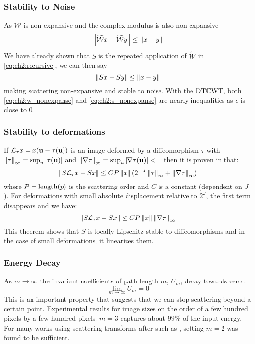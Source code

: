 \subsubsection{Stability to Noise}
As $\mathcal{W}$ is non-expansive and the complex modulus is also non-expansive
\begin{equation}
  \left\lVert \widetilde{\mathcal{W}}x - \widetilde{\mathcal{W}}y \right\rVert \leq \left\lVert x-y \right\rVert \label{eq:ch2:w_nonexpanse}
\end{equation}
We have already shown that $S$ is the repeated application of $\widetilde{\mathcal{W}}$ in
\eqref{eq:ch2:recursive}, we can then say
\begin{equation}
  \left\lVert Sx - Sy \right\rVert \leq \left\lVert x-y \right\rVert\label{eq:ch2:s_nonexpanse}
\end{equation}
making scattering non-expansive and stable to noise. With the $\mathrm{DT}\mathbb{C}\mathrm{WT}$, both
\eqref{eq:ch2:w_nonexpanse} and \eqref{eq:ch2:s_nonexpanse} are nearly
inequalities as $\epsilon$ is close to 0.

\subsubsection{Stability to deformations}
If $\mathcal{L}_\tau x = x(\mathbf{u} -\tau(\mathbf{u}))$ is an image deformed
by a diffeomorphism $\tau$ with $\left\lVert \tau \right\rVert_\infty = \sup_u |\tau(\mathbf{u})|$
and $\left\lVert \nabla \tau \right\rVert_\infty = \sup_u |\nabla \tau(\mathbf{u})| < 1$ then it is
proven in \cite{mallat_group_2012} that:
%
\begin{equation}
  \left\lVert  S \mathcal{L}_{\tau}x  - S x \right\rVert \leq C P \left\lVert x \right\rVert
  (2^{-J}\left\lVert \tau \right\rVert_\infty + \left\lVert \nabla \tau \right\rVert_\infty )
\end{equation}
%
where $P = \mathrm{length}(p)$ is the scattering order and $C$ is a constant
(dependent on $J$). For deformations with small absolute displacement relative
to $2^J$, the first term disappears and we have:
\begin{equation}
  \left\lVert  S \mathcal{L}_{\tau}x  - S x \right\rVert \leq C P \left\lVert x \right\rVert \left\lVert \nabla \tau \right\rVert_\infty  \label{eq:ch2:stability}
\end{equation}
This theorem shows that $S$ is locally Lipschitz stable to diffeomorphisms and in
the case of small deformations, it linearizes them.

\subsubsection{Energy Decay}
As $m \rightarrow \infty$ the invariant coefficients of path length $m$, $U_m$,
decay towards zero \cite{mallat_group_2012}:
\begin{equation}
  \lim_{m \rightarrow \infty} U_m = 0
\end{equation}
This is an important property that suggests that we can stop scattering beyond a
certain point. Experimental results \cite{bruna_invariant_2013} for
image sizes on the order of a few hundred pixels by a few
hundred pixels, $m=3$ captures about $99\%$ of the input energy. For many works
using scattering transforms after \cite{bruna_invariant_2013} such as
\cite{oyallon_deep_2015, oyallon_hybrid_2017, oyallon_scaling_2017}, setting
$m=2$ was found to be sufficient.

